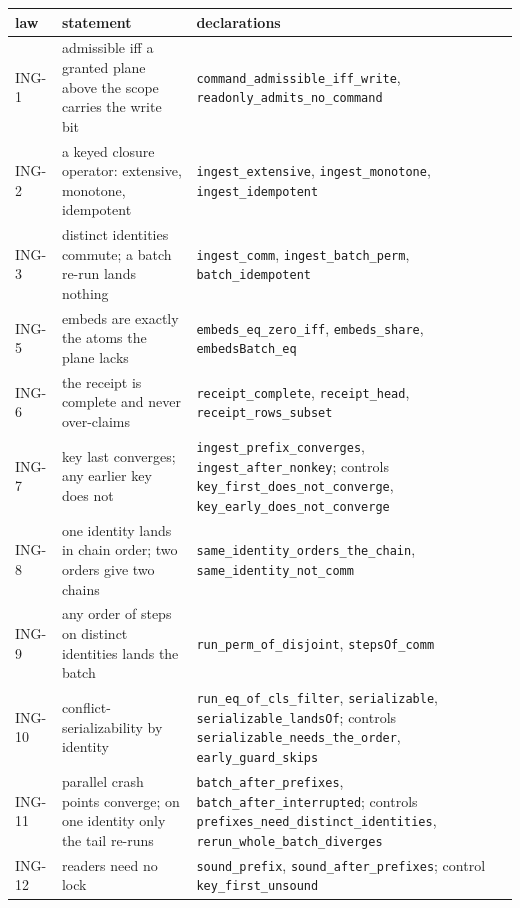 \documentclass[11pt]{article}
\theoremstyle{plain}
\theoremstyle{definition}
\theoremstyle{remark}
\newcommand{\lean}[1]{\texttt{#1}}
\newcommand{\ing}[1]{ING-#1}
\begin{document}
\begin{table}[t]
\centering\footnotesize
\begin{tabular}{>{\raggedright\arraybackslash}p{}>{\raggedright\arraybackslash}p{}>{\raggedright\arraybackslash}p{}}
\toprule
law & statement & declarations \\
\midrule
\ing{1} & admissible iff a granted plane above the scope carries the write bit & \lean{command\_admissible\_iff\_write}, \lean{readonly\_admits\_no\_command} \\
\ing{2} & a keyed closure operator: extensive, monotone, idempotent & \lean{ingest\_extensive}, \lean{ingest\_monotone}, \lean{ingest\_idempotent} \\
\ing{3} & distinct identities commute; a batch re-run lands nothing & \lean{ingest\_comm}, \lean{ingest\_batch\_perm}, \lean{batch\_idempotent} \\
\ing{5} & embeds are exactly the atoms the plane lacks & \lean{embeds\_eq\_zero\_iff}, \lean{embeds\_share}, \lean{embedsBatch\_eq} \\
\ing{6} & the receipt is complete and never over-claims & \lean{receipt\_complete}, \lean{receipt\_head}, \lean{receipt\_rows\_subset} \\
\ing{7} & key last converges; any earlier key does not & \lean{ingest\_prefix\_converges}, \lean{ingest\_after\_nonkey}; controls \lean{key\_first\_does\_not\_converge}, \lean{key\_early\_does\_not\_converge} \\
\ing{8} & one identity lands in chain order; two orders give two chains & \lean{same\_identity\_orders\_the\_chain}, \lean{same\_identity\_not\_comm} \\
\ing{9} & any order of steps on distinct identities lands the batch & \lean{run\_perm\_of\_disjoint}, \lean{stepsOf\_comm} \\
\ing{10} & conflict-serializability by identity & \lean{run\_eq\_of\_cls\_filter}, \lean{serializable}, \lean{serializable\_landsOf}; controls \lean{serializable\_needs\_the\_order}, \lean{early\_guard\_skips} \\
\ing{11} & parallel crash points converge; on one identity only the tail re-runs & \lean{batch\_after\_prefixes}, \lean{batch\_after\_interrupted}; controls \lean{prefixes\_need\_distinct\_identities}, \lean{rerun\_whole\_batch\_diverges} \\
\ing{12} & readers need no lock & \lean{sound\_prefix}, \lean{sound\_after\_prefixes}; control \lean{key\_first\_unsound} \\

\end{tabular}
\end{table}
\end{document}
